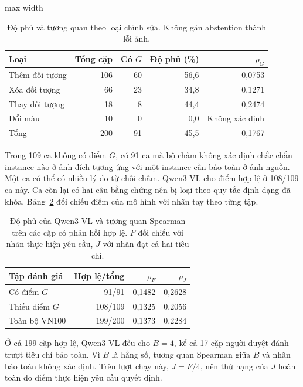 \begin{table}[!ht]\centering\small
\caption{Độ phủ và tương quan theo loại chỉnh sửa. Không gán abstention thành lỗi ảnh.}\label{tab:coverage}
\begin{adjustbox}{max width=\linewidth}\begin{tabular}{@{}lrrrr@{}}\toprule
Loại & Tổng cặp & Có $G$ & Độ phủ (\%) & $\rho_G$\\\midrule
Thêm đối tượng & 106 & 60 & 56,6 & 0,0753\\
Xóa đối tượng & 66 & 23 & 34,8 & 0,1271\\
Thay đối tượng & 18 & 8 & 44,4 & 0,2474\\
Đổi màu & 10 & 0 & 0,0 & Không xác định\\\midrule
Tổng & 200 & 91 & 45,5 & 0,1767\\
\bottomrule\end{tabular}\end{adjustbox}\end{table}

Trong 109 ca không có điểm $G$, có 91 ca mà bộ chấm không xác định chắc chắn
instance nào ở ảnh đích tương ứng với một instance cần bảo toàn ở ảnh nguồn.
Một ca có thể có nhiều lý do từ chối chấm. Qwen3-VL cho điểm hợp lệ ở 108/109 ca này. Ca còn lại có hai câu bằng chứng nên bị loại theo quy tắc định dạng đã khóa. Bảng~\ref{tab:nv3-judge-panels} đối chiếu điểm của mô hình với nhãn tay theo từng tập.

\begin{table}[!ht]\centering\small
\caption{Độ phủ của Qwen3-VL và tương quan Spearman trên các cặp có phản hồi hợp lệ. $F$ đối chiếu với nhãn thực hiện yêu cầu, $J$ với nhãn đạt cả hai tiêu chí.}\label{tab:nv3-judge-panels}
\begin{tabular}{@{}lrrr@{}}\toprule
Tập đánh giá & Hợp lệ/tổng & $\rho_F$ & $\rho_J$\\\midrule
Có điểm $G$ & 91/91 & 0,1482 & 0,2628\\
Thiếu điểm $G$ & 108/109 & 0,1325 & 0,2056\\
Toàn bộ VN100 & 199/200 & 0,1373 & 0,2284\\
\bottomrule\end{tabular}\end{table}

Ở cả 199 cặp hợp lệ, Qwen3-VL đều cho $B=4$, kể cả 17 cặp người duyệt đánh trượt tiêu chí bảo toàn. Vì $B$ là hằng số, tương quan Spearman giữa $B$ và nhãn bảo toàn không xác định. Trên lượt chạy này, $J=F/4$, nên thứ hạng của $J$ hoàn toàn do điểm thực hiện yêu cầu quyết định.

